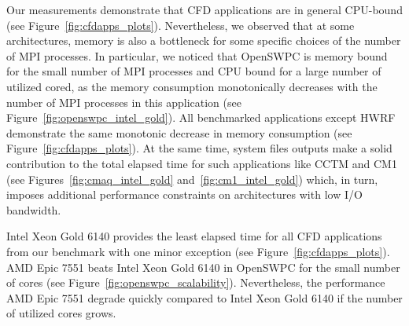 
Our measurements demonstrate that  CFD  applications  are  in  general  CPU-bound (see Figure~\ref{fig:cfdapps_plots}).
Nevertheless,   we   observed   that   at   some architectures,
memory  is also  a  bottleneck  for  some  specific choices  of the  number  of  MPI processes.
In  particular,  we  noticed  that  OpenSWPC is  memory  bound  for  the  small  number  of  MPI  processes
and CPU bound for a large number of utilized cored,
as the memory consumption monotonically decreases with the number of MPI processes in this application
(see Figure~\ref{fig:openswpc_intel_gold}).
All benchmarked applications except HWRF demonstrate the same monotonic decrease in memory consumption (see Figure~\ref{fig:cfdapps_plots}).
At the same time, system files outputs make a solid contribution to the total elapsed time for such applications
like CCTM and CM1 (see Figures~\ref{fig:cmaq_intel_gold} and~\ref{fig:cm1_intel_gold})
which, in turn, imposes additional performance constraints on architectures with low I/O bandwidth.

Intel Xeon Gold 6140 provides the least elapsed time for all CFD applications from our benchmark
with one minor exception  (see Figure~\ref{fig:cfdapps_plots}).
AMD Epic 7551 beats Intel Xeon Gold 6140 in OpenSWPC for the small number of cores (see Figure~\ref{fig:openswpc_scalability}).
Nevertheless, the performance AMD Epic 7551 degrade quickly compared to Intel Xeon Gold 6140 if the number of utilized cores grows.



